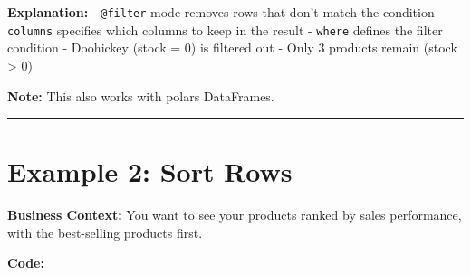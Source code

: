 \documentclass[
  letterpaper,
]{scrbook}
\begin{document}
\textbf{Explanation:} -
\texttt{\textquotesingle{}@filter\textquotesingle{}} mode removes rows
that don't match the condition - \texttt{columns} specifies which
columns to keep in the result - \texttt{where} defines the filter
condition - Doohickey (stock = 0) is filtered out - Only 3 products
remain (stock \textgreater{} 0)

\textbf{Note:} This also works with polars DataFrames.

\begin{center}\rule{0.5\linewidth}{0.5pt}\end{center}

\section{Example 2: Sort Rows}\label{example-2-sort-rows}

\textbf{Business Context:} You want to see your products ranked by sales
performance, with the best-selling products first.

\textbf{Code:}
\end{document}
